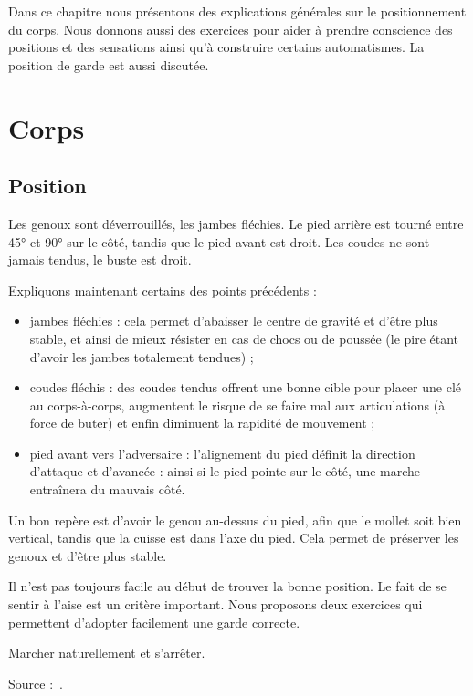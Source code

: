 Dans ce chapitre nous présentons des explications générales sur le positionnement du corps.
Nous donnons aussi des exercices pour aider à prendre conscience des positions et des sensations ainsi qu'à construire certains automatismes.
La position de garde est aussi discutée.


\section{Corps}


\subsection{Position}


Les genoux sont déverrouillés, les jambes fléchies.
Le pied arrière est tourné entre 45° et 90° sur le côté, tandis que le pied avant est droit.
Les coudes ne sont jamais tendus, le buste est droit.

Expliquons maintenant certains des points précédents :
\begin{itemize}
	\item jambes fléchies : cela permet d'abaisser le centre de gravité et d'être plus stable, et ainsi de mieux résister en cas de chocs ou de poussée (le pire étant d'avoir les jambes totalement tendues) ;
	\item coudes fléchis : des coudes tendus offrent une bonne cible pour placer une clé au corps-à-corps, augmentent le risque de se faire mal aux articulations (à force de buter) et enfin diminuent la rapidité de mouvement ;
	\item pied avant vers l'adversaire : l'alignement du pied définit la direction d'attaque et d'avancée : ainsi si le pied pointe sur le côté, une marche entraînera du mauvais côté.
\end{itemize}

Un bon repère est d'avoir le genou au-dessus du pied, afin que le mollet soit bien vertical, tandis que la cuisse est dans l'axe du pied.
Cela permet de préserver les genoux et d'être plus stable.

Il n'est pas toujours facile au début de trouver la bonne position.
Le fait de se sentir à l'aise est un critère important.
Nous proposons deux exercices qui permettent d'adopter facilement une garde correcte.

\begin{exercice}

Marcher naturellement et s'arrêter.

Source :~\cite{guidoux:dijon:thibault:2015}.

\end{exercice}


